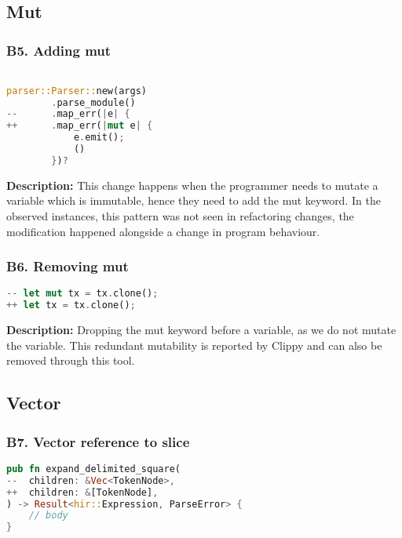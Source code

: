 \subsection{Mut}
\subsubsection{B5. Adding mut}

\begin{lstlisting}[language=Rust, style=colouredRust, label={l3}]

parser::Parser::new(args)
        .parse_module()
--      .map_err(|e| {
++      .map_err(|mut e| {
            e.emit();
            ()
        })?

\end{lstlisting}

\noindent \textbf{Description:} This change happens when the programmer needs to mutate a variable which is immutable, hence they need to add the mut keyword. In the observed instances, this pattern was not seen in refactoring changes, the modification happened alongside a change in program behaviour.

\subsubsection{B6. Removing mut}

\begin{lstlisting}[language=Rust, style=colouredRust, label={l3}]
-- let mut tx = tx.clone();
++ let tx = tx.clone();
\end{lstlisting}

\noindent \textbf{Description:} Dropping the mut keyword before a variable, as we do not mutate the variable. This redundant mutability is reported by Clippy and can also be removed through this tool.

\subsection{Vector}
\subsubsection{B7. Vector reference to slice}

\begin{lstlisting}[language=Rust, style=colouredRust, label={l3}]
pub fn expand_delimited_square(
--  children: &Vec<TokenNode>,
++  children: &[TokenNode],
) -> Result<hir::Expression, ParseError> {
    // body
}
\end{lstlisting}

